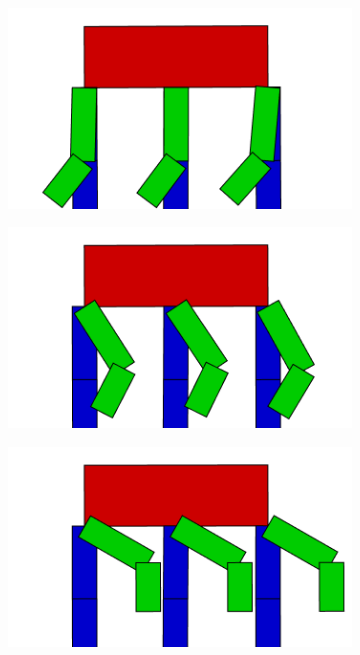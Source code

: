 \begin{figure}[H]
        \begin{subfigure}[b]{0.3\textwidth}
          \includegraphics[width=\linewidth,center]{graphics/movement/35}
          \caption{\label{fig:ConceptMovement35}}
        \end{subfigure}
        \hspace{\fill}
        \begin{subfigure}[b]{0.3\textwidth}
          \includegraphics[width=\linewidth,center]{graphics/movement/36}
          \caption{\label{fig:ConceptMovement36}}
        \end{subfigure}
        \hspace{\fill}
        \begin{subfigure}[b]{0.3\textwidth}
          \includegraphics[width=\linewidth,center]{graphics/movement/40}
          \caption{\label{fig:ConceptMovement40}}
        \end{subfigure}


\end{figure}
